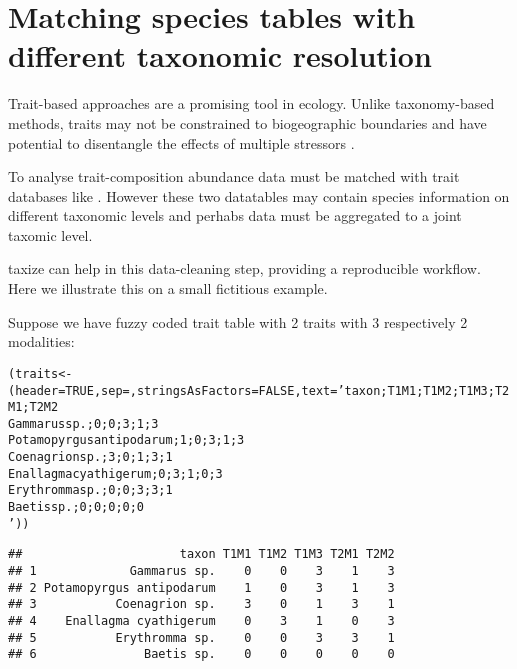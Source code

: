 \section{Matching species tables with different taxonomic resolution} 

Trait-based approaches are a promising tool in ecology. Unlike taxonomy-based methods, traits may not be constrained to biogeographic boundaries \citep{baird_toward_2011} and have potential to disentangle the effects of multiple stressors \citep{statzner_can_2010}. 

To analyse trait-composition abundance data must be matched with trait databases like \citet{usseglio-polatera_biological_2000}. However these two datatables may contain species information on different taxonomic levels and perhabs data must be aggregated to a joint taxomic level.

taxize can help in this data-cleaning step, providing a reproducible workflow. Here we illustrate this on a small fictitious example.

Suppose we have fuzzy coded trait table with 2 traits with 3 respectively 2 modalities:
\begin{knitrout}
\color{fgcolor}\begin{kframe}
\begin{alltt}
(traits <- (header = TRUE, sep = , stringsAsFactors=FALSE, text = 'taxon;T1M1;T1M2;T1M3;T2M1;T2M2
Gammarus sp.;0;0;3;1;3
Potamopyrgus antipodarum;1;0;3;1;3
Coenagrion sp.;3;0;1;3;1
Enallagma cyathigerum;0;3;1;0;3
Erythromma sp.;0;0;3;3;1
Baetis sp.;0;0;0;0;0
'))
\end{alltt}
\begin{verbatim}
##                      taxon T1M1 T1M2 T1M3 T2M1 T2M2
## 1             Gammarus sp.    0    0    3    1    3
## 2 Potamopyrgus antipodarum    1    0    3    1    3
## 3           Coenagrion sp.    3    0    1    3    1
## 4    Enallagma cyathigerum    0    3    1    0    3
## 5           Erythromma sp.    0    0    3    3    1
## 6               Baetis sp.    0    0    0    0    0
\end{verbatim}
\end{kframe}
\end{knitrout}


